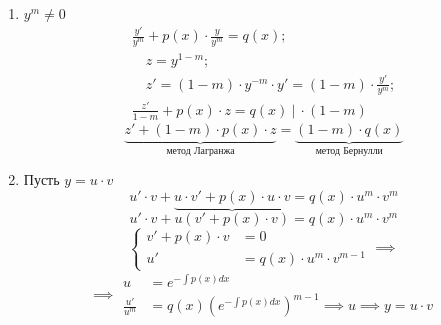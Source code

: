 \documentclass[11pt,a4paper,oneside]{report}
\theoremstyle{definition}
\theoremstyle{plain}
\theoremstyle{remark}
\begin{document}
\begin{enumerate}
    \item $y^m \ne 0$
          \begin{align*}
              \frac{y'}{y^m} + p(x) \cdot \frac{y}{y^m} = q(x);                 \\
              \quad z = y^{1-m};                                                \\
              \quad z' = (1-m)\cdot y^{-m}\cdot y' = (1-m)\cdot \frac{y'}{y^m}; \\
              \frac{z'}{1-m} + p(x) \cdot z = q(x) \ \Big| \ \cdot (1-m)
          \end{align*}
          \begin{equation*}
              \underbrace{z' + (1-m) \cdot p(x) \cdot z}_{\text{метод Лагранжа}} = \underbrace{(1-m)\cdot q(x)}_{\text{метод Бернулли}}
          \end{equation*}

    \item Пусть $y = u\cdot v$
          \begin{equation*}
              u' \cdot v + \underbrace{u \cdot v' + p(x) \cdot u \cdot v} = q(x) \cdot u^m \cdot v^m
          \end{equation*}
          \begin{equation*}
              u' \cdot v  + u(v' + p(x) \cdot v) = q(x) \cdot u^m\cdot v^m
          \end{equation*}
          \begin{equation*}
              \left\{\begin{array}{rl}
                  v' + p(x) \cdot v & = 0                            \\
                  u'                & = q(x) \cdot u^m \cdot v^{m-1}
              \end{array}\right. \implies
          \end{equation*}
          \begin{equation*}
              \implies \begin{array}{rl}
                  u              & = e^{-\int p(x)dx}                                               \\
                  \frac{u'}{u^m} & = q(x)(e^{-\int p(x)dx})^{m-1} \implies u \implies y = u \cdot v
              \end{array}
          \end{equation*}
\end{enumerate}
\end{document}
